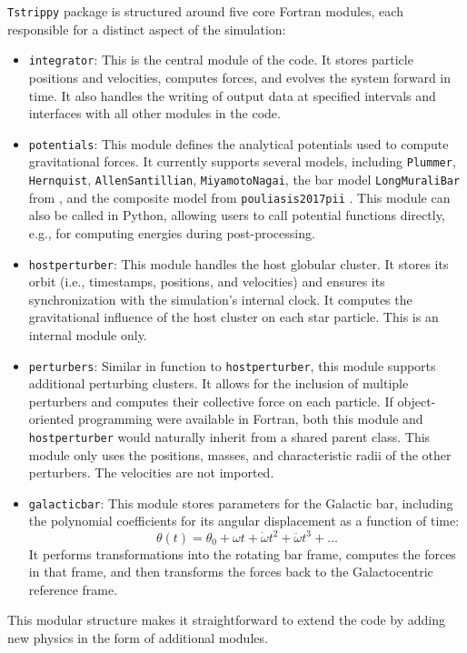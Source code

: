 \documentclass{article}
\begin{document}
    \texttt{Tstrippy} package is structured around five core Fortran modules, each responsible for a distinct aspect of the simulation:
    \begin{itemize}
        \item \texttt{integrator}: This is the central module of the code. It stores particle positions and velocities, computes forces, and evolves the system forward in time. It also handles the writing of output data at specified intervals and interfaces with all other modules in the code.
        \item \texttt{potentials}: This module defines the analytical potentials used to compute gravitational forces. It currently supports several models, including \texttt{Plummer}, \texttt{Hernquist}, \texttt{AllenSantillian}, \texttt{MiyamotoNagai}, the bar model \texttt{LongMuraliBar} from \citet{1992ApJ...397...44L}, and the composite model from \texttt{pouliasis2017pii} \citep{2017A&A...598A..66P}. This module can also be called in Python, allowing users to call potential functions directly, e.g., for computing energies during post-processing.
        \item \texttt{hostperturber}: This module handles the host globular cluster. It stores its orbit (i.e., timestamps, positions, and velocities) and ensures its synchronization with the simulation's internal clock. It computes the gravitational influence of the host cluster on each star particle. This is an internal module only.
        \item \texttt{perturbers}: Similar in function to \texttt{hostperturber}, this module supports additional perturbing clusters. It allows for the inclusion of multiple perturbers and computes their collective force on each particle. If object-oriented programming were available in Fortran, both this module and \texttt{hostperturber} would naturally inherit from a shared parent class. This module only uses the positions, masses, and characteristic radii of the other perturbers. The velocities are not imported.
        \item \texttt{galacticbar}: This module stores parameters for the Galactic bar, including the polynomial coefficients for its angular displacement as a function of time:
        \[
        \theta(t) = \theta_0 + \omega t + \dot{\omega} t^2 + \ddot{\omega} t^3 + \dots
        \]
        It performs transformations into the rotating bar frame, computes the forces in that frame, and then transforms the forces back to the Galactocentric reference frame.
    \end{itemize}
    This modular structure makes it straightforward to extend the code by adding new physics in the form of additional modules.
\end{document}
